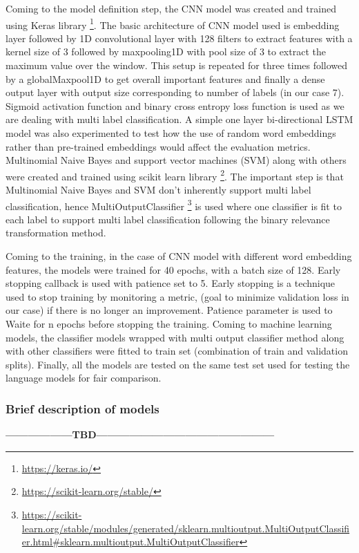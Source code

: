 Coming to the model definition step, the CNN model was created and trained using Keras library \footnote{\url{https://keras.io/}}. The basic architecture of CNN model used is embedding layer followed by 1D convolutional layer with 128 filters to extract features with a kernel size of 3 followed by maxpooling1D with pool size of 3 to extract the maximum value over the window. This setup is repeated for three times followed by a globalMaxpool1D to get overall important features and finally a dense output layer with output size corresponding to number of labels (in our case 7). Sigmoid activation function and binary cross entropy loss function is used as we are dealing with multi label classification. A simple one layer bi-directional LSTM model was also experimented to test how the use of random word embeddings rather than pre-trained embeddings would affect the evaluation metrics. Multinomial Naive Bayes and support vector machines (SVM) along with others were created and trained using scikit learn library \footnote{\url{https://scikit-learn.org/stable/}}. The important step is that Multinomial Naive Bayes and SVM don't inherently support multi label classification, hence MultiOutputClassifier \footnote{\url{https://scikit-learn.org/stable/modules/generated/sklearn.multioutput.MultiOutputClassifier.html#sklearn.multioutput.MultiOutputClassifier}} is used where one classifier is fit to each label to support multi label classification following the binary relevance transformation method.

Coming to the training, in the case of CNN model with different word embedding features, the models were  trained for 40 epochs, with a batch size of 128. Early stopping callback is used with patience set to 5.
Early stopping is a technique used to stop training by monitoring a metric, (goal to minimize validation loss in our case) if there is no longer an improvement. Patience parameter is used to Waite for n epochs before stopping the training. Coming to machine learning models, the classifier models wrapped with multi output classifier method along with other classifiers were fitted to train set (combination of train and validation splits). Finally, all the models are tested on the same test set used for testing the language models for fair comparison.

\subsubsection{Brief description of models}
\textbf{------------------TBD------------------------------------------------}


